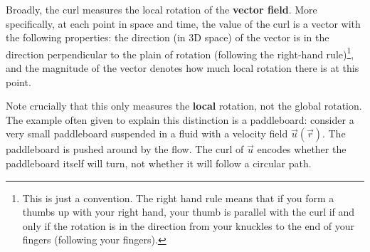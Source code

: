 Broadly, the curl measures the local rotation of the \textbf{vector field}. More specifically, at each point in space and time, the value of the curl is a vector with the following properties: the direction (in 3D space) of the vector is in the direction perpendicular to the plain of rotation (following the right-hand rule)\footnote{This is just a convention. The right hand rule means that if you form a thumbs up with your right hand, your thumb is parallel with the curl if and only if the rotation is in the direction from your knuckles to the end of your fingers (following your fingers).}, and the magnitude of the vector denotes how much local rotation there is at this point.

Note crucially that this only measures the \textbf{local} rotation, not the global rotation. The example often given to explain this distinction is a paddleboard: consider a very small paddleboard suspended in a fluid with a velocity field $\vec{u}(\vec{r})$. The paddleboard is pushed around by the flow. The curl of $\vec{u}$ encodes whether the paddleboard itself will turn, not whether it will follow a circular path.

